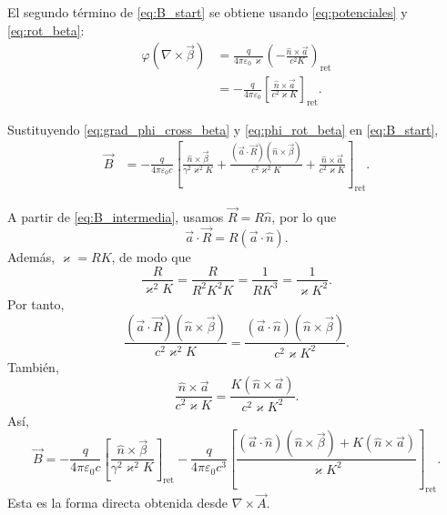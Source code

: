 \documentclass{article}
\numberwithin{equation}{section}
\newcommand{\eps}{\varepsilon_0}
\newcommand{\bv}{\vec{\beta}}
\newcommand{\av}{\vec{a}}
\newcommand{\Rv}{\vec{R}}
\newcommand{\nh}{\hat{n}}
\newcommand{\K}{K}
\begin{document}
El segundo t\'ermino de \eqref{eq:B_start} se obtiene usando \eqref{eq:potenciales} y \eqref{eq:rot_beta}:
\begin{equation}
\begin{aligned}  \varphi(\nabla\times\bv)
  &=\frac{q}{4\pi\eps\,\varkappa}
  \left(-\frac{\nh\times\av}{c^2\K}\right)_{\mathrm{ret}} \\
  &=-\frac{q}{4\pi\eps}
  \left[
  \frac{\nh\times\av}{c^2\varkappa\K}
  \right]_{\mathrm{ret}}.
\end{aligned}
  \label{eq:phi_rot_beta}
\end{equation}

Sustituyendo \eqref{eq:grad_phi_cross_beta} y \eqref{eq:phi_rot_beta} en
\eqref{eq:B_start},
\begin{equation}
\begin{aligned}  \vec{B}
  &=-\frac{q}{4\pi\eps c}
  \left[
  \frac{\nh\times\bv}{\gamma^2\varkappa^2\K}
  +\frac{(\av\cdot\Rv)(\nh\times\bv)}{c^2\varkappa^2\K}
  +\frac{\nh\times\av}{c^2\varkappa\K}
  \right]_{\mathrm{ret}}.
\end{aligned}
  \label{eq:B_intermedia}
\end{equation}

A partir de \eqref{eq:B_intermedia}, usamos $\Rv=R\nh$, por lo que
\begin{equation*}
  \av\cdot\Rv=R(\av\cdot\nh).
\end{equation*}
Adem\'as, $\varkappa=R\K$, de modo que
\begin{equation*}
  \frac{R}{\varkappa^2\K}
  =\frac{R}{R^2\K^2\K}
  =\frac{1}{R\K^3}
  =\frac{1}{\varkappa\K^2}.
\end{equation*}
Por tanto,
\begin{equation*}
  \frac{(\av\cdot\Rv)(\nh\times\bv)}{c^2\varkappa^2\K}
  =\frac{(\av\cdot\nh)(\nh\times\bv)}{c^2\varkappa\K^2}.
\end{equation*}
Tambi\'en,
\begin{equation*}
  \frac{\nh\times\av}{c^2\varkappa\K}
  =\frac{\K(\nh\times\av)}{c^2\varkappa\K^2}.
\end{equation*}
As\'i,
\begin{equation}
  \boxed{
  \vec{B}
  =-\frac{q}{4\pi\eps c}
  \left[
  \frac{\nh\times\bv}{\gamma^2\varkappa^2\K}
  \right]_{\mathrm{ret}}
  -\frac{q}{4\pi\eps c^3}
  \left[
  \frac{(\av\cdot\nh)(\nh\times\bv)+\K(\nh\times\av)}{\varkappa\K^2}
  \right]_{\mathrm{ret}}.
  }
  \label{eq:B_directa}
\end{equation}
Esta es la forma directa obtenida desde $\nabla\times\vec{A}$.
\end{document}
